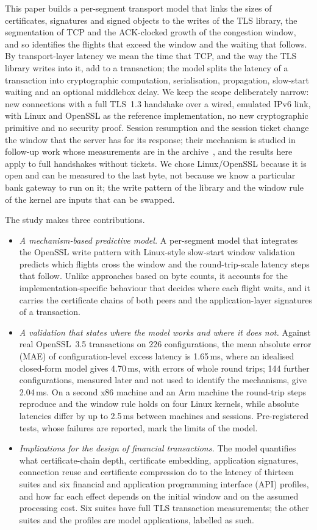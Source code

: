 \documentclass[preprint,12pt]{elsarticle}
\newcommand{\ms}{\,ms\xspace}
\begin{document}
This paper builds a per-segment transport model that links the sizes of certificates, signatures and signed objects to the writes of the TLS library, the segmentation of TCP and the ACK-clocked growth of the congestion window, and so identifies the flights that exceed the window and the waiting that follows. By transport-layer latency we mean the time that TCP, and the way the TLS library writes into it, add to a transaction; the model splits the latency of a transaction into cryptographic computation, serialisation, propagation, slow-start waiting and an optional middlebox delay. We keep the scope deliberately narrow: new connections with a full TLS~1.3 handshake over a wired, emulated IPv6 link, with Linux and OpenSSL as the reference implementation, no new cryptographic primitive and no security proof. Session resumption and the session ticket change the window that the server has for its response; their mechanism is studied in follow-up work whose measurements are in the archive~\cite{dinh2026artifact}, and the results here apply to full handshakes without tickets. We chose Linux/OpenSSL because it is open and can be measured to the last byte, not because we know a particular bank gateway to run on it; the write pattern of the library and the window rule of the kernel are inputs that can be swapped.

The study makes three contributions.
\begin{itemize}
\item \emph{A mechanism-based predictive model.} A per-segment model that integrates the OpenSSL write pattern with Linux-style slow-start window validation predicts which flights cross the window and the round-trip-scale latency steps that follow. Unlike approaches based on byte counts, it accounts for the implementation-specific behaviour that decides where each flight waits, and it carries the certificate chains of both peers and the application-layer signatures of a transaction.
\item \emph{A validation that states where the model works and where it does not.} Against real OpenSSL~3.5 transactions on 226 configurations, the mean absolute error (MAE) of configuration-level excess latency is 1.65\ms, where an idealised closed-form model gives 4.70\ms, with errors of whole round trips; 144 further configurations, measured later and not used to identify the mechanisms, give 2.04\ms. On a second x86 machine and an Arm machine the round-trip steps reproduce and the window rule holds on four Linux kernels, while absolute latencies differ by up to 2.5\ms between machines and sessions. Pre-registered tests, whose failures are reported, mark the limits of the model.
\item \emph{Implications for the design of financial transactions.} The model quantifies what certificate-chain depth, certificate embedding, application signatures, connection reuse and certificate compression do to the latency of thirteen suites and six financial and application programming interface (API) profiles, and how far each effect depends on the initial window and on the assumed processing cost. Six suites have full TLS transaction measurements; the other suites and the profiles are model applications, labelled as such.
\end{itemize}
\end{document}
